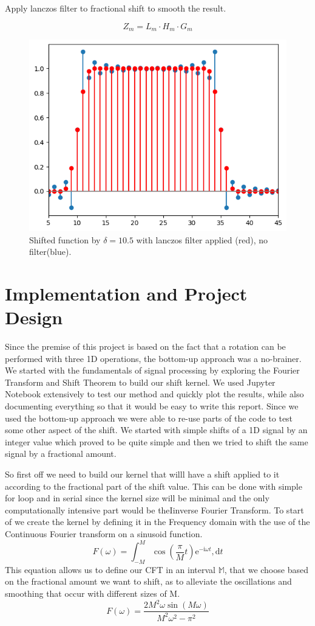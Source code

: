 \documentclass[]{usiinfbachelorproject}
\begin{document}
	Apply lanczos filter to fractional shift to smooth the result.
	
	\begin{equation*}
		Z_m = L_m \cdot H_m \cdot G_m
	\end{equation*}
	
	\begin{figure}[h]
		\centering
		\includegraphics[width=0.5\columnwidth]{images/box_shifted_lanczos_delta10_1_n50.png}
		\caption{Shifted function by $\delta=10.5$ with lanczos filter applied (red), no filter(blue).}
	\end{figure}
	
	\fi
	
	\newpage
	
	\section{Implementation and Project Design}
		Since the premise of this project is based on the fact that a rotation can be performed with three 1D operations, the bottom-up approach was a no-brainer. We started with the fundamentals of signal processing by exploring the Fourier Transform and Shift Theorem to build our shift kernel. We used Jupyter Notebook extensively to test our method and quickly plot the results, while also documenting everything so that it would be easy to write this report. Since we used the bottom-up approach we were able to re-use parts of the code to test some other aspect of the shift. We started with simple shifts of a 1D signal by an integer value which proved to be quite simple and then we tried to shift the same signal by a fractional amount.
		
		So first off we need to build our kernel that willl have a shift applied to it according to the fractional part of the shift value. This can be done with simple for loop and in serial since the kernel size will be minimal and the only computationally intensive part would be theIinverse Fourier Transform. 
		To start of we create the kernel by defining it in the Frequency domain with the use of the Continuous Fourier transform on a sinusoid function.
		\begin{equation}
			F(\omega) = \int_{-M}^{M} \cos(\frac{\pi}{M}t)\mathrm{e}^{-\mathrm{i}\omega t},\mathrm{d}t
		\end{equation}
		This equation allows us to define our CFT in an interval $\mathbb{M}$, that we choose based on the fractional amount we want to shift, as to alleviate the oscillations and smoothing that occur with different sizes of M.
		\begin{equation}
			F(\omega) = \frac{2M^2\omega \sin(M\omega)}{M^2\omega^2-\pi^2}
		\end{equation}
		
\end{document}
